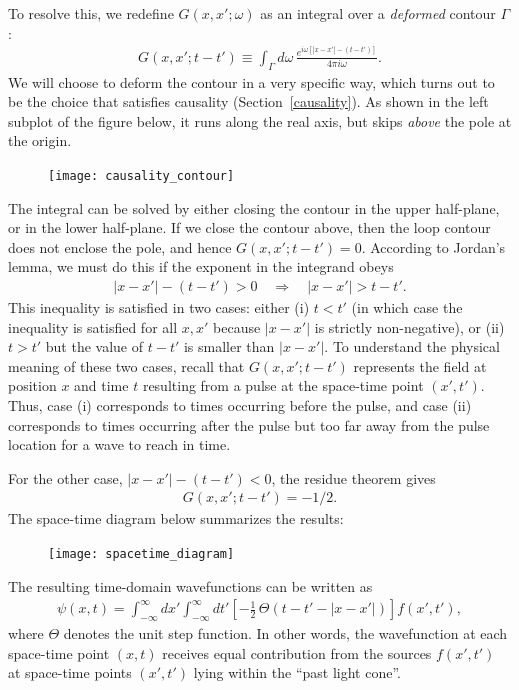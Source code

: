 \documentclass[10pt,a4paper]{article}
\begin{document}
To resolve this, we redefine $G(x,x';\omega)$ as an integral over a
\textit{deformed} contour $\Gamma$:
\begin{align}
  G(x,x';t-t') \equiv \int_\Gamma d\omega \, \frac{e^{i\omega \left[|x-x'| - (t-t')\right]}}{4\pi i\omega}.
\end{align}
We will choose to deform the contour in a very specific way, which
turns out to be the choice that satisfies causality
(Section~\ref{causality}).  As shown in the left subplot of the figure
below, it runs along the real axis, but skips \textit{above} the pole
at the origin.

\begin{figure}[ht]
  \centering\texttt{[image: causality\_contour]}
\end{figure}

The integral can be solved by either closing the contour in the upper
half-plane, or in the lower half-plane. If we close the contour above,
then the loop contour does not enclose the pole, and hence
$G(x,x';t-t') = 0$. According to Jordan's lemma, we must do this if
the exponent in the integrand obeys
\begin{align}
  |x-x'| - (t-t') > 0  \quad \Rightarrow \quad |x-x'| > t-t'.
\end{align}
This inequality is satisfied in two cases: either (i) $t < t'$ (in
which case the inequality is satisfied for all $x,x'$ because $|x-x'|$
is strictly non-negative), or (ii) $t > t'$ but the value of $t-t'$ is
smaller than $|x-x'|$.  To understand the physical meaning of these
two cases, recall that $G(x,x';t-t')$ represents the field at position
$x$ and time $t$ resulting from a pulse at the space-time point
$(x',t')$.  Thus, case (i) corresponds to times occurring before the
pulse, and case (ii) corresponds to times occurring after the pulse
but too far away from the pulse location for a wave to reach in time.

For the other case, $|x-x'| - (t-t') < 0$, the residue theorem gives
\begin{align}
  G(x,x';t-t') = -1/2.
\end{align}
The space-time diagram below summarizes the results:

\begin{figure}[ht]
  \centering\texttt{[image: spacetime\_diagram]}
\end{figure}

The resulting time-domain wavefunctions can be written as
\begin{align}
  \psi(x,t) = \int_{-\infty}^\infty dx' \int_{-\infty}^\infty dt' \left[-\frac{1}{2}\,\Theta(t-t' - |x-x'|)\right] f(x',t'),
\end{align}
where $\Theta$ denotes the unit step function.  In other words, the
wavefunction at each space-time point $(x,t)$ receives equal
contribution from the sources $f(x',t')$ at space-time points
$(x',t')$ lying within the ``past light cone''.
\end{document}

